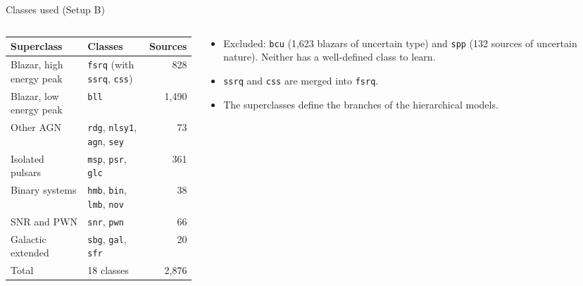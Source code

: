 \documentclass[aspectratio=169, 10pt]{beamer}
\newcommand{\cls}[1]{\texttt{#1}}
\begin{document}
\begin{frame}{Classes used (Setup B)}
  \begin{columns}[T]
    \begin{column}{0.55\textwidth}
      \scriptsize
      \begin{tabular}{llr}
        \toprule
        Superclass & Classes & Sources \\
        \midrule
        Blazar, high energy peak & \cls{fsrq} (with \cls{ssrq}, \cls{css}) & 828 \\
        Blazar, low energy peak & \cls{bll} & 1,490 \\
        Other AGN & \cls{rdg}, \cls{nlsy1}, \cls{agn}, \cls{sey} & 73 \\
        Isolated pulsars & \cls{msp}, \cls{psr}, \cls{glc} & 361 \\
        Binary systems & \cls{hmb}, \cls{bin}, \cls{lmb}, \cls{nov} & 38 \\
        SNR and PWN & \cls{snr}, \cls{pwn} & 66 \\
        Galactic extended & \cls{sbg}, \cls{gal}, \cls{sfr} & 20 \\
        \midrule
        Total & 18 classes & 2,876 \\
        \bottomrule
      \end{tabular}
    \end{column}
    \begin{column}{0.42\textwidth}
      \small
      \begin{itemize}
        \item Excluded: \cls{bcu} (1,623 blazars of uncertain type) and \cls{spp} (132 sources
              of uncertain nature). Neither has a well-defined class to learn.
        \item \cls{ssrq} and \cls{css} are merged into \cls{fsrq}.
        \item The superclasses define the branches of the hierarchical models.
      \end{itemize}
    \end{column}
  \end{columns}
\end{frame}
\end{document}

